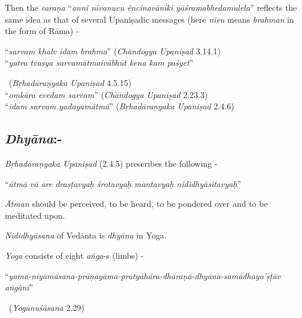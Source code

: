 Then the \textit{caraṇa} “\textit{anni nīvanucu êncinavāniki yāśramabhedamulela}” reflects the same idea as that of several Upaniṣadic messages (here \textit{nīvu} means \textit{brahman} in the form of Rāma) -

\begin{myquote}
“\textit{sarvam khalv idam brahma}” (\textit{Chāndogya Upaniṣad} 3.14.1)\\ “\textit{yatra tvasya sarvamātmaivābhūt kena kam paśyet}” 

~\hfill (\textit{Bṛhadāraṇyaka Upaniṣad} 4.5.15)\\ “\textit{omkāra evedam sarvam}” (\textit{Chāndogya Upaniṣad} 2.23.3)\\ “\textit{idam sarvam yadayamātmā}” (\textit{Bṛhadāraṇyaka Upaniṣad} 2.4.6)
\end{myquote}

\vspace{-.4cm}

\subsection*{\textit{Dhyāna}:-}

\vspace{-.2cm}

\textit{Bṛhadāraṇyaka Upaniṣad} (2.4.5) prescribes the following -

\begin{myquote}
“\textit{ātmā vā are draṣṭavyaḥ śrotavyaḥ mantavyaḥ nididhyāsitavyaḥ}”
\end{myquote}

\textit{Ātman} should be perceived, to be heard, to be pondered over and to be meditated upon.

\textit{Nididhyāsana} of Vedānta is \textit{dhyāna} in Yoga.

\textit{Yoga} consists of eight \textit{aṅga}-s (limbs) -

\begin{myquote}
“\textit{yama-niyamāsana-prāṇāyāma-pratyāhāra-dhāraṇā-dhyāna-samādhayo’ṣṭāv aṅgāni}” 

\vspace{-.2cm}

~\hfill (\textit{Yogānuśāsana} 2.29)
\end{myquote}

